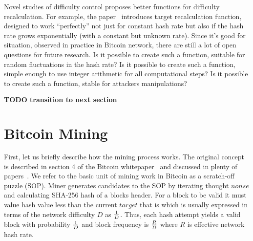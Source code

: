 \documentclass[number,preprint,review]{elsarticle}
\begin{document}
Novel studies of difficulty control proposes better functions for difficulty recalculation.
For example, the paper~\cite{kraft2015difficulty} introduces target recalculation function, designed to work “perfectly” not just for constant hash rate but also if the hash rate grows exponentially (with a constant but unknown rate).
Since it's good for situation, observed in practice in Bitcoin network, there are still a lot of open questions for future research.
Is it possible to create such a function, suitable for random fluctuations in the hash rate?
Is it possible to create such a function, simple enough to use integer arithmetic for all computational steps?
Is it possible to create such a function, stable for attackers manipulations?

\textbf{TODO transition to next section}

\section{Bitcoin Mining}
\label{sec:bit}

First, let us briefly describe how the mining process works.
The original concept is described in section 4 of the Bitcoin whitepaper~\cite{Nakamoto2008} and discussed in plenty of papers~\cite{kraft2015difficulty, miller2014permacoin, eyal2014majority}.
We refer to the basic unit of mining work in Bitcoin as a scratch-off puzzle (SOP).
Miner generates candidates to the SOP by iterating thought \(nonse\) and calculating SHA-256 hash of a blocks header.
For a block to be valid it must value hash value less than the current \(target\) that is which is usually expressed in terms of the network difficulty \(D\) as \(1\over D\).
Thus, each hash attempt yields a valid block with probability \(1\over D\) and block frequency is \(R\over D\) where \(R\) is effective network hash rate.
\end{document}
